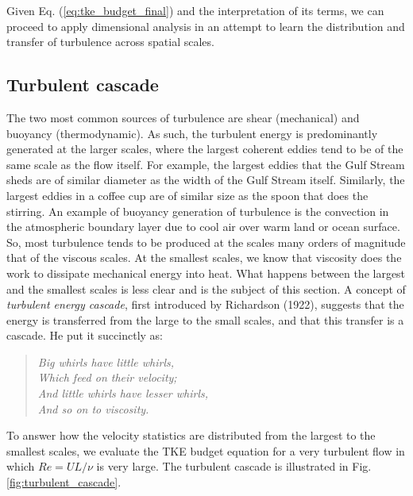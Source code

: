 \documentclass[12pt]{article}
\numberwithin{equation}{section}
\numberwithin{figure}{section}
\numberwithin{table}{section}
\begin{document}
Given Eq. (\ref{eq:tke_budget_final}) and the interpretation of its terms,
we can proceed to apply dimensional analysis in an attempt to learn the
distribution and transfer of turbulence across spatial scales.

\subsection{Turbulent cascade}

The two most common sources of turbulence are shear (mechanical) and buoyancy
(thermodynamic).
As such, the turbulent energy is predominantly generated at the larger scales,
where the largest coherent eddies tend to be of the same scale as the flow
itself.
For example, the largest eddies that the Gulf Stream sheds are of similar
diameter as the width of the Gulf Stream itself.
Similarly, the largest eddies in a coffee cup are of similar size as the spoon
that does the stirring.
An example of buoyancy generation of turbulence is the convection in the 
atmospheric boundary layer due to cool air over warm land or ocean surface.
So, most turbulence tends to be produced at the scales many orders of magnitude
that of the viscous scales.
At the smallest scales, we know that viscosity does the work to dissipate
mechanical energy into heat.
What happens between the largest and the smallest scales is less clear and is
the subject of this section.
A concept of \textit{turbulent energy cascade},
first introduced by Richardson (1922),
suggests that the energy is transferred from the large to the small scales,
and that this transfer is a cascade.
He put it succinctly as:

\begin{quote}
  \textit{
    \noindent Big whirls have little whirls,\\
    Which feed on their velocity;\\
    And little whirls have lesser whirls,\\
    And so on to viscosity.
  }
\end{quote}

To answer how the velocity statistics are distributed from the largest to the
smallest scales, we evaluate the TKE budget equation for a very turbulent flow
in which $Re = UL/\nu$ is very large.
The turbulent cascade is illustrated in Fig. \ref{fig:turbulent_cascade}.
\end{document}
